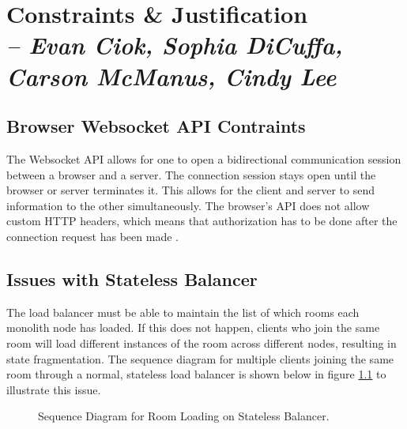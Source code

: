 \chapter{Constraints \& Justification \\
  \small{\textit{-- Evan Ciok, Sophia DiCuffa, Carson McManus, Cindy Lee}}
  \label{Chapter::ConstraintsJustification}}

\section{Browser Websocket API Contraints}

The Websocket API allows for one to open a bidirectional communication session between a browser and a server. The connection session stays open until the browser or server terminates it.
This allows for the client and server to send information to the other simultaneously. The browser's API does not allow custom HTTP headers, which means that authorization has to be done after the connection request has been made \cite{MDNWebSocket} \cite{HerokuWebSocket}.

\section{Issues with Stateless Balancer}

The load balancer must be able to maintain the list of which rooms each monolith node has loaded. If this does not happen, clients who join the same room will load different instances of the room across different nodes, resulting in state fragmentation. The sequence diagram for multiple clients joining the same room through a normal, stateless load balancer is shown below in figure \ref{Figure::join-room-stateless} to illustrate this issue.

\begin{figure}[!htb]
  \centering
  \caption{\label{Figure::join-room-stateless} Sequence Diagram for Room Loading on Stateless Balancer.}
\end{figure}


